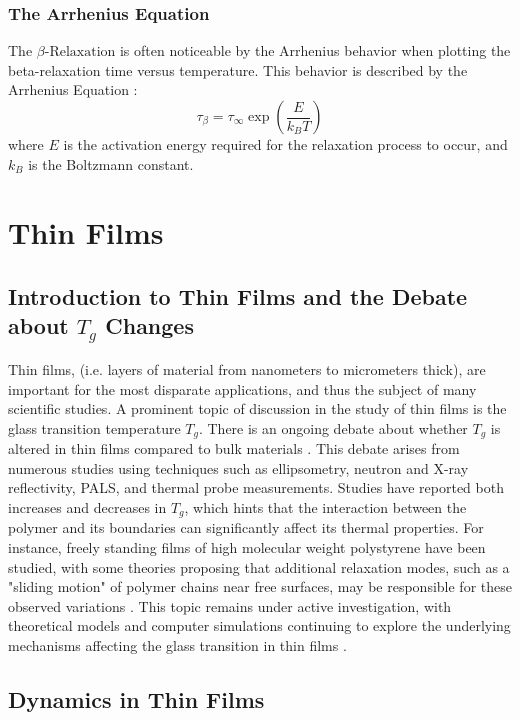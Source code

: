 \subsubsection{The Arrhenius Equation}

The $\beta\text{-Relaxation}$ is often noticeable by the Arrhenius behavior when plotting the beta-relaxation time versus temperature. This behavior is described by the Arrhenius Equation \cite{zhao2023}:
\begin{equation}
\label{arreq}
\tau_{\beta} = \tau_{\infty} \exp\left(\frac{E}{k_B T}\right)
\end{equation}
where \(E\) is the activation energy required for the relaxation process to occur, and \(k_B\) is the Boltzmann constant.

\section{Thin Films}
\subsection{Introduction to Thin Films and the Debate about $T_g$ Changes}
Thin films, (i.e. layers of material from nanometers to micrometers thick), are important for the most disparate applications, and thus the subject of many scientific studies. A prominent topic of discussion in the study of thin films is the glass transition temperature \(T_g\). There is an ongoing debate about whether \(T_g\) is altered in thin films compared to bulk materials \cite{serghei}. This debate arises from numerous studies using techniques such as ellipsometry, neutron and X-ray reflectivity, \ac{PALS}, and thermal probe measurements. Studies have reported both increases and decreases in \(T_g\), which hints that the interaction between the polymer and its boundaries can significantly affect its thermal properties. For instance, freely standing films of high molecular weight polystyrene have been studied, with some theories proposing that additional relaxation modes, such as a "sliding motion" of polymer chains near free surfaces, may be responsible for these observed variations \cite{FUJITA}. This topic remains under active investigation, with theoretical models and computer simulations continuing to explore the underlying mechanisms affecting the glass transition in thin films \cite{kremer2003}.
\subsection{Dynamics in Thin Films}

